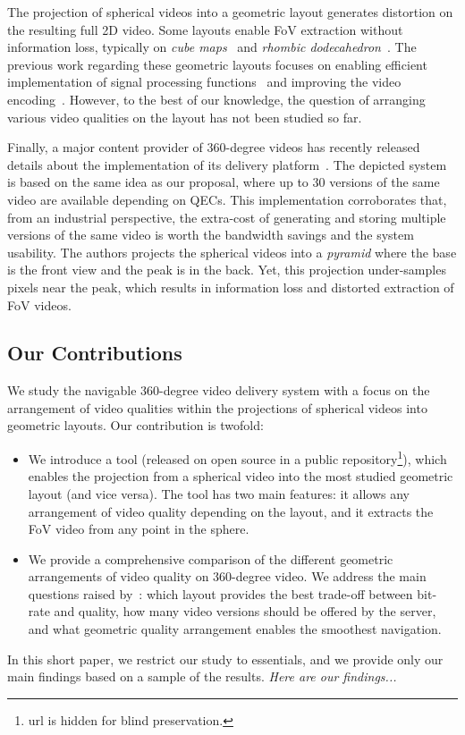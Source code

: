 The projection of spherical videos into a geometric layout generates
distortion on the resulting
full 2D video. Some layouts enable \ac{FoV} extraction without information
loss, typically on \emph{cube maps}~\cite{Ng2005} and
\emph{rhombic dodecahedron}~\cite{fu_rhombic_2009}. The previous work regarding
these
geometric layouts focuses on enabling efficient implementation of signal processing
functions~\cite{kazhdan_metric-aware_2010} and improving the video
encoding~\cite{tosic_low_2009}.
However, to the best of our knowledge, the
question of arranging various video qualities on the layout has not been studied so far.

Finally, a major content provider of 360-degree videos has recently released details about the
implementation of its delivery platform~\cite{facebook}. The depicted system is based
on the same idea as our proposal, where up to 30 versions of the same video are available depending on
\acp{QEC}. This implementation corroborates that, from an industrial perspective, the
extra-cost of
generating and storing multiple versions of the same video is worth the bandwidth
savings and the system usability. The authors projects the spherical videos into a \emph{pyramid}
where the
base is the front
view and the peak is in the back. Yet, this projection under-samples pixels near the peak,
which
results in
information loss and distorted extraction of \ac{FoV} videos.

\subsection{Our Contributions}

%
We study the navigable 360-degree video delivery system with a
focus on the arrangement of video qualities within the projections of
spherical videos into geometric layouts. Our contribution is twofold:
\begin{itemize}
\item We introduce a tool (released on open source in a public
repository\footnote{url is hidden for blind
preservation.}), which enables the projection from a spherical video
into the most studied  geometric layout (and vice versa). The tool has two main
features: it allows
any arrangement of video quality depending on the layout, and it
extracts the
\ac{FoV} video from any point in the sphere.
\item We provide a comprehensive comparison of the different geometric arrangements of
video quality on 360-degree video. We address the main questions raised
by~\citet{facebook}: which layout provides the best trade-off
between bit-rate and
quality, how many video versions should be offered by the server, and what geometric
quality arrangement
enables the smoothest navigation.
\end{itemize}

In this short paper, we restrict our study to essentials, and we provide only our main findings based on a
sample of the results. \textit{Here are our findings...}




